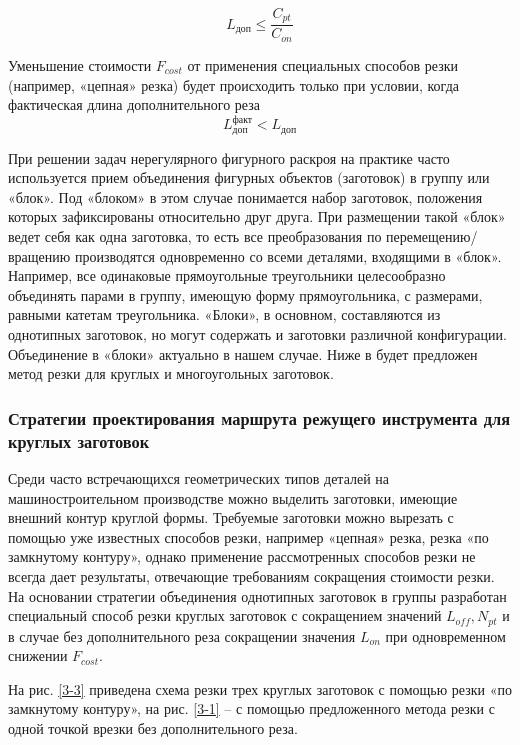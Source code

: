\documentclass{article}
\begin{document}
\begin{equation}
  L_\text{доп} \leqslant \frac{C_{pt}}{C_{on}}
  \label{l-dop}
\end{equation}

Уменьшение стоимости
$F_{cost}$
от применения специальных способов резки
(например, «цепная» резка)
будет происходить только при условии,
когда фактическая длина дополнительного реза
\begin{equation}
  L_\text{доп}^\text{факт} < L_\text{доп}
  \label{l-fact-dop}
\end{equation}

При решении задач нерегулярного фигурного раскроя
на практике часто используется прием объединения
фигурных объектов (заготовок)
в группу или «блок».
Под «блоком» в этом случае понимается набор заготовок,
положения которых зафиксированы относительно друг друга.
При размещении такой «блок» ведет себя как одна заготовка,
то есть все преобразования по перемещению/вращению производятся
одновременно со всеми деталями, входящими в «блок».
Например, все одинаковые прямоугольные треугольники
целесообразно объединять парами в группу, имеющую форму прямоугольника,
с размерами, равными катетам треугольника.
«Блоки», в основном, составляются из однотипных заготовок,
но могут содержать и заготовки различной конфигурации.
Объединение в «блоки» актуально в нашем случае.
Ниже в будет предложен метод резки для круглых и многоугольных заготовок.

\subsubsection{Стратегии проектирования маршрута режущего инструмента для круглых заготовок}

Среди часто встречающихся геометрических типов деталей
на машиностроительном производстве можно выделить заготовки,
имеющие внешний контур круглой формы.
Требуемые заготовки можно вырезать с
помощью уже известных способов резки,
например «цепная» резка, резка «по замкнутому контуру»,
однако применение рассмотренных способов резки не всегда
дает результаты, отвечающие требованиям сокращения стоимости резки.
На основании стратегии объединения однотипных заготовок
в группы разработан специальный способ резки круглых
заготовок с сокращением значений
$L_{off}, N_{pt}$
и в случае без дополнительного реза сокращении значения
$L_{on}$
при одновременном снижении
$F_{cost}$.

На рис. \ref{3-3}
приведена схема резки трех круглых заготовок
с помощью резки «по замкнутому контуру»,
на рис. \ref{3-1}
– с помощью предложенного метода резки
с одной точкой врезки без дополнительного реза.
\end{document}
